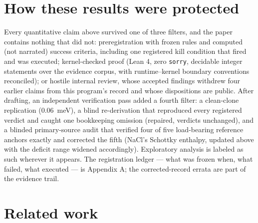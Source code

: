 \documentclass[11pt]{article}
\theoremstyle{definition}
\theoremstyle{remark}
\newcommand{\code}[1]{\texttt{#1}}
\begin{document}
\section*{How these results were protected}

Every quantitative claim above survived one of three filters, and the paper contains nothing that did not: preregistration with frozen rules and computed (not narrated) success criteria, including one registered kill condition that fired and was executed; kernel-checked proof (Lean 4, zero \code{sorry}, decidable integer statements over the evidence corpus, with runtime--kernel boundary conventions reconciled); or hostile internal review, whose accepted findings withdrew four earlier claims from this program's record and whose dispositions are public. After drafting, an independent verification pass added a fourth filter: a clean-clone replication (0.06~meV), a blind re-derivation that reproduced every registered verdict and caught one bookkeeping omission (repaired, verdicts unchanged), and a blinded primary-source audit that verified four of five load-bearing reference anchors exactly and corrected the fifth (NaCl's Schottky enthalpy, updated above with the deficit range widened accordingly). Exploratory analysis is labeled as such wherever it appears. The registration ledger --- what was frozen when, what failed, what executed --- is Appendix A; the corrected-record errata are part of the evidence trail.

\section*{Related work}
\end{document}
